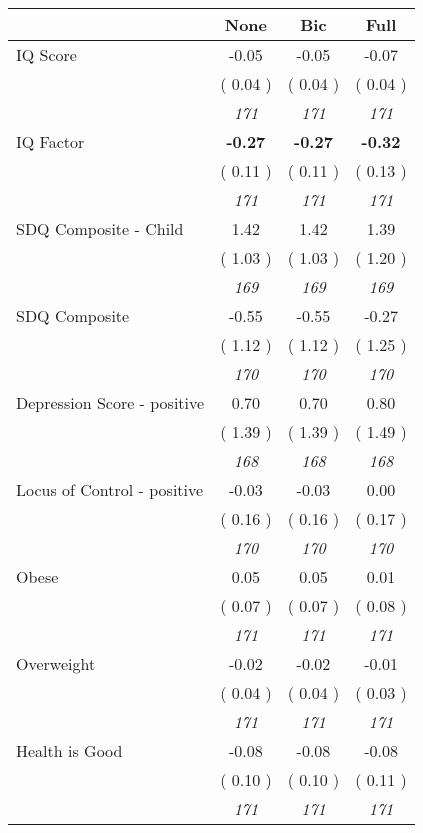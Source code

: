\begin{tabular}{l c c c}
\toprule
 & None & Bic & Full \\
\midrule
IQ Score &     -0.05 &     -0.05 &     -0.07 \\
& (     0.04 ) & (     0.04 ) & (     0.04 ) \\
& \textit{ 171 } & \textit{ 171 } & \textit{ 171 } \\
IQ Factor & \textbf{     -0.27 } & \textbf{     -0.27 } & \textbf{     -0.32 } \\
& (     0.11 ) & (     0.11 ) & (     0.13 ) \\
& \textit{ 171 } & \textit{ 171 } & \textit{ 171 } \\
SDQ Composite - Child &      1.42 &      1.42 &      1.39 \\
& (     1.03 ) & (     1.03 ) & (     1.20 ) \\
& \textit{ 169 } & \textit{ 169 } & \textit{ 169 } \\
SDQ Composite &     -0.55 &     -0.55 &     -0.27 \\
& (     1.12 ) & (     1.12 ) & (     1.25 ) \\
& \textit{ 170 } & \textit{ 170 } & \textit{ 170 } \\
Depression Score - positive &      0.70 &      0.70 &      0.80 \\
& (     1.39 ) & (     1.39 ) & (     1.49 ) \\
& \textit{ 168 } & \textit{ 168 } & \textit{ 168 } \\
Locus of Control - positive &     -0.03 &     -0.03 &      0.00 \\
& (     0.16 ) & (     0.16 ) & (     0.17 ) \\
& \textit{ 170 } & \textit{ 170 } & \textit{ 170 } \\
Obese &      0.05 &      0.05 &      0.01 \\
& (     0.07 ) & (     0.07 ) & (     0.08 ) \\
& \textit{ 171 } & \textit{ 171 } & \textit{ 171 } \\
Overweight &     -0.02 &     -0.02 &     -0.01 \\
& (     0.04 ) & (     0.04 ) & (     0.03 ) \\
& \textit{ 171 } & \textit{ 171 } & \textit{ 171 } \\
Health is Good &     -0.08 &     -0.08 &     -0.08 \\
& (     0.10 ) & (     0.10 ) & (     0.11 ) \\
& \textit{ 171 } & \textit{ 171 } & \textit{ 171 } \\

\end{tabular}
